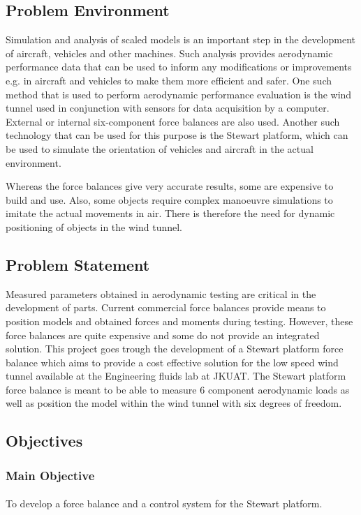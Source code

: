 \subsection{Problem Environment}
Simulation and analysis of scaled models is an important step in the development of aircraft, vehicles and other machines. Such analysis provides aerodynamic performance data that can be used to inform any modifications or improvements e.g. in aircraft and vehicles to make them more efficient and safer. One such method that is used to perform aerodynamic performance evaluation is the wind tunnel used in conjunction with sensors for data acquisition by a computer. External or internal six-component force balances are also used. Another such technology that can be used for this purpose is the Stewart platform, which can be used to simulate the
orientation of vehicles and aircraft in the actual environment.

Whereas the force balances give very accurate results, some are expensive to build and use. Also, some objects require complex manoeuvre simulations to imitate the actual movements in air. There is therefore the need for dynamic positioning of objects in the wind tunnel.
\subsection{Problem Statement}
Measured parameters obtained in aerodynamic testing are critical in the development of parts. Current commercial force balances provide means to position models and obtained forces and moments during testing.
However, these force balances are quite expensive and some do not provide an integrated solution. This project goes trough the development of a Stewart platform force balance which aims to provide a cost effective solution for the low speed wind tunnel available at the Engineering fluids lab at JKUAT.
The Stewart platform force balance is meant to be able to measure 6 component aerodynamic loads as well as position the model within the wind tunnel with six degrees of freedom.
\subsection{Objectives}
\subsubsection{Main Objective}
\paragraph{} To develop a force balance and a control system for the Stewart platform.
